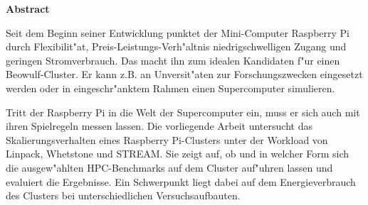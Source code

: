 \vspace*{2cm}

\begin{center}
    \textbf{Abstract}
\end{center}

\vspace*{1cm}

\noindent 
Seit dem Beginn seiner Entwicklung punktet der Mini-Computer Raspberry Pi durch Flexibilit"at, Preis-Leistungs-Verh"altnis niedrigschwelligen Zugang und geringen Stromverbrauch. Das macht ihn zum idealen Kandidaten f"ur einen Beowulf-Cluster. Er kann z.B. an Unversit"aten zur Forschungszwecken eingesetzt werden oder in eingeschr"anktem Rahmen einen Supercomputer simulieren. 

Tritt der Raspberry Pi in die Welt der Supercomputer ein, muss er sich auch mit ihren Spielregeln messen lassen. Die vorliegende Arbeit untersucht das Skalierungsverhalten eines Raspberry Pi-Clusters unter der Workload von Linpack, Whetstone und STREAM. Sie zeigt auf, ob und in welcher Form sich die ausgew"ahlten HPC-Benchmarks auf dem Cluster auf"uhren lassen und evaluiert die Ergebnisse. Ein Schwerpunkt liegt dabei auf dem Energieverbrauch des Clusters bei unterschiedlichen Versuchsaufbauten. 
